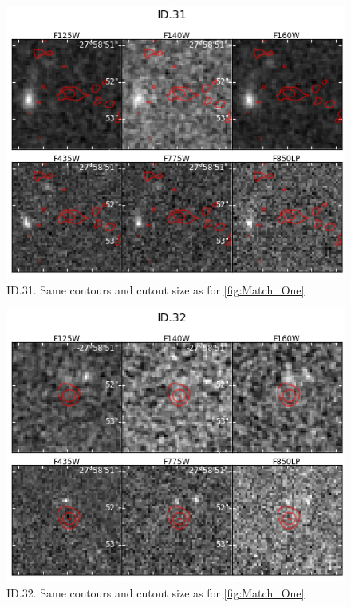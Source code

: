 \begin{figure}[tbp]
\centering \includegraphics[width=160mm]{Matched/ASPECS_Cutout_30.jpg}
\caption{ID.31. Same contours and cutout size as for \ref{fig:Match_One}.}
\label{fig:Match_Three}
\end{figure}

\begin{figure}[tbp]
\centering \includegraphics[width=160mm]{Matched/ASPECS_Cutout_31.jpg}
\caption{ID.32. Same contours and cutout size as for \ref{fig:Match_One}.}
\label{fig:Match_Three}
\end{figure}

